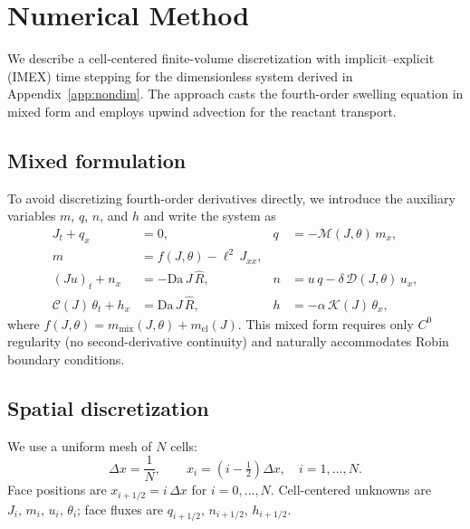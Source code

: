 \documentclass[aps,pre,reprint,superscriptaddress,longbibliography,floatfix]{revtex4-2}
\newcommand{\Ms}{\mathcal{M}}
\newcommand{\Ds}{\mathcal{D}}
\newcommand{\Cs}{\mathcal{C}}
\newcommand{\Ks}{\mathcal{K}}
\newcommand{\Da}{\mathrm{Da}}
\newcommand{\Rhat}{\widehat{R}}
\begin{document}
\section{Numerical Method}
\label{app:numerics}

We describe a cell-centered finite-volume discretization with implicit--explicit (IMEX) time stepping for the dimensionless system derived in Appendix~\ref{app:nondim}. The approach casts the fourth-order swelling equation in mixed form and employs upwind advection for the reactant transport.

\subsection{Mixed formulation}

To avoid discretizing fourth-order derivatives directly, we introduce the auxiliary variables $m$, $q$, $n$, and $h$ and write the system as
\begin{align}
  J_t + q_x &= 0, & q &= -\Ms(J,\theta)\,m_x, \label{eq:mixed_J} \\
  m &= f(J,\theta) - \ell^2\,J_{xx}, \label{eq:mixed_m} \\
  (Ju)_t + n_x &= -\Da\,J\,\Rhat, & n &= u\,q - \delta\,\Ds(J,\theta)\,u_x, \label{eq:mixed_u} \\
  \Cs(J)\,\theta_t + h_x &= \Da\,J\,\Rhat, & h &= -\alpha\,\Ks(J)\,\theta_x, \label{eq:mixed_T}
\end{align}
where $f(J,\theta) = m_\mathrm{mix}(J,\theta) + m_\mathrm{el}(J)$. This mixed form requires only $C^0$ regularity (no second-derivative continuity) and naturally accommodates Robin boundary conditions.

\subsection{Spatial discretization}

We use a uniform mesh of $N$ cells:
\begin{equation}
  \Delta x = \frac{1}{N},
  \qquad
  x_i = \left(i - \tfrac{1}{2}\right)\Delta x,
  \quad i = 1,\dots,N.
  \label{eq:mesh}
\end{equation}
Face positions are $x_{i+1/2} = i\,\Delta x$ for $i=0,\dots,N$. Cell-centered unknowns are $J_i,\,m_i,\,u_i,\,\theta_i$; face fluxes are $q_{i+1/2},\,n_{i+1/2},\,h_{i+1/2}$.
\end{document}
